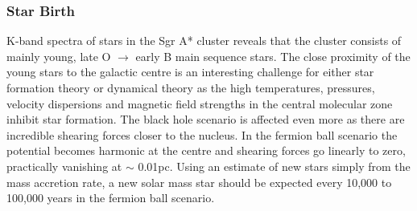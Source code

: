 \subsubsection{Star Birth}
K-band spectra of stars in the Sgr A* cluster \cite{ref_gezari} reveals that the cluster consists of mainly young, late O $\rightarrow$ early B
main sequence stars. The close proximity of the young stars to the galactic centre is an interesting challenge for either star
formation theory or dynamical theory as the high temperatures, pressures, velocity dispersions and magnetic field strengths in the
central molecular zone inhibit star formation. The black hole scenario is affected even more as there are incredible shearing forces closer
to the nucleus. In the fermion ball scenario the potential becomes harmonic at the centre and shearing forces go linearly to zero, practically
vanishing at $\sim$ 0.01pc.
Using an estimate of new stars simply from the mass accretion rate, a new solar mass star should be expected every 10,000 to 100,000 years
in the fermion ball scenario.
